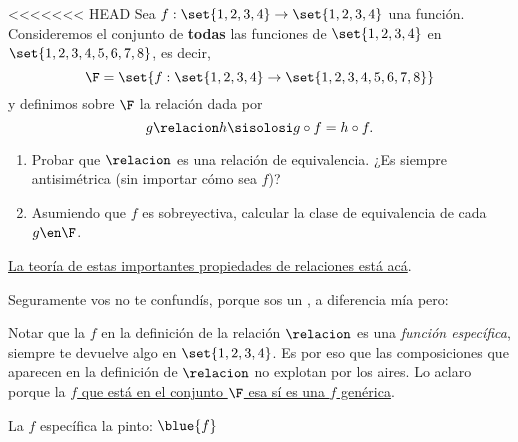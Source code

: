 \begin{enunciado}{\ejercicio}
<<<<<<< HEAD
  Sea $f: \set{1,2,3,4} \to \set{1,2,3,4}$ una función.
  Consideremos el conjunto de \textbf{todas} las funciones de $\set{1,2,3,4}$ en $\set{1,2,3,4,5,6,7,8}$, es decir,
  $$
    \F = \set{f: \set{1,2,3,4} \to \set{1,2,3,4,5,6,7,8}}
  $$
  y definimos sobre $\F$ la relación dada por
  $$
    g \relacion h \sisolosi g \circ f = h\circ f.
  $$

  \begin{enumerate}[label=\roman*)]
    \item Probar  que $\relacion$ es una relación de equivalencia. ¿Es siempre antisimétrica (sin importar cómo sea $f$)?

    \item Asumiendo que $f$ es sobreyectiva, calcular la clase de equivalencia de cada $g \en \F$.
  \end{enumerate}
\end{enunciado}

\hyperlink{teoria-1:relaciones}{La teoría de estas importantes propiedades de relaciones está acá}.

Seguramente vos no te confundís, porque sos un {}, a diferencia mía pero:

\par
Notar que la $f$ en la definición de la relación $\relacion$
es una \textit{función específica}, siempre te devuelve algo en $\set{1,2,3,4}$. Es por eso que las composiciones que aparecen en la definición
de $\relacion$ no explotan  por los aires. Lo aclaro porque la \underline{$f$ que está en el conjunto $\F$ esa sí es una $f$ genérica}.\par
La $f$ específica la pinto: $\blue{f}$


